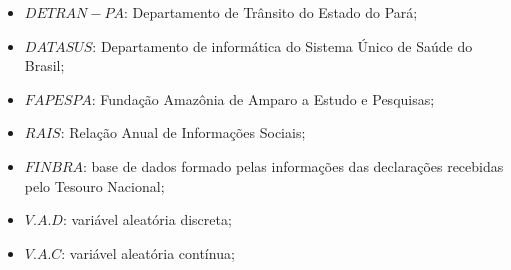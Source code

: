 \begin{refsection}
\begin{itemize}
\item $DETRAN-PA$: Departamento de Trânsito do Estado do Pará;
\item $DATASUS$: Departamento de informática do Sistema Único de Saúde do Brasil; 
\item $FAPESPA$: Fundação Amazônia de Amparo a Estudo e Pesquisas;
\item $RAIS$: Relação Anual de Informações Sociais;
\item $FINBRA$:  base de dados formado pelas informações das declarações recebidas pelo Tesouro Nacional; 
 \item $V.A.D$: variável aleatória discreta;
\item $V.A.C$: variável aleatória contínua;
\end{itemize}




\printbibliography[heading=subbibliography]
\end{refsection}